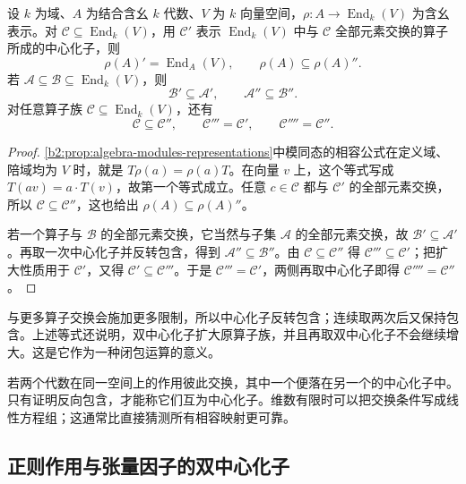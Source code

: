 \begin{proposition}\label{b2:prop:commutant-endomorphism}
	设 \(k\) 为域、\(A\) 为结合含幺 \(k\) 代数、\(V\) 为 \(k\) 向量空间，\(\rho:A\to\operatorname{End}_k(V)\) 为含幺表示。对 \(\mathcal C\subseteq\operatorname{End}_k(V)\)，用 \(\mathcal C'\) 表示 \(\operatorname{End}_k(V)\) 中与 \(\mathcal C\) 全部元素交换的算子所成的中心化子，则
	\[
		\rho(A)'=\operatorname{End}_A(V),\qquad \rho(A)\subseteq\rho(A)''.
	\]
	若 \(\mathcal A\subseteq\mathcal B\subseteq\operatorname{End}_k(V)\)，则
	\[
		\mathcal B'\subseteq\mathcal A',\qquad \mathcal A''\subseteq\mathcal B''.
	\]
	对任意算子族 \(\mathcal C\subseteq\operatorname{End}_k(V)\)，还有
	\[
		\mathcal C\subseteq\mathcal C'',\qquad \mathcal C'''=\mathcal C',\qquad \mathcal C''''=\mathcal C''.
	\]
\end{proposition}
\begin{proof}
	\cref{b2:prop:algebra-modules-representations}中模同态的相容公式在定义域、陪域均为 \(V\) 时，就是 \(T\rho(a)=\rho(a)T\)。在向量 \(v\) 上，这个等式写成 \(T(av)=a\cdot T(v)\)，故第一个等式成立。任意 \(c\in\mathcal C\) 都与 \(\mathcal C'\) 的全部元素交换，所以 \(\mathcal C\subseteq\mathcal C''\)，这也给出 \(\rho(A)\subseteq\rho(A)''\)。

	若一个算子与 \(\mathcal B\) 的全部元素交换，它当然与子集 \(\mathcal A\) 的全部元素交换，故 \(\mathcal B'\subseteq\mathcal A'\)。再取一次中心化子并反转包含，得到 \(\mathcal A''\subseteq\mathcal B''\)。由 \(\mathcal C\subseteq\mathcal C''\) 得 \(\mathcal C'''\subseteq\mathcal C'\)；把扩大性质用于 \(\mathcal C'\)，又得 \(\mathcal C'\subseteq\mathcal C'''\)。于是 \(\mathcal C'''=\mathcal C'\)，两侧再取中心化子即得 \(\mathcal C''''=\mathcal C''\)。
\end{proof}

与更多算子交换会施加更多限制，所以中心化子反转包含；连续取两次后又保持包含。上述等式还说明，双中心化子扩大原算子族，并且再取双中心化子不会继续增大。这是它作为一种闭包运算的意义。

\ProseParagraphBreak
若两个代数在同一空间上的作用彼此交换，其中一个便落在另一个的中心化子中。只有证明反向包含，才能称它们互为中心化子。维数有限时可以把交换条件写成线性方程组；这通常比直接猜测所有相容映射更可靠。

\subsection{正则作用与张量因子的双中心化子}
\label{b2:subsec:1104:02}

